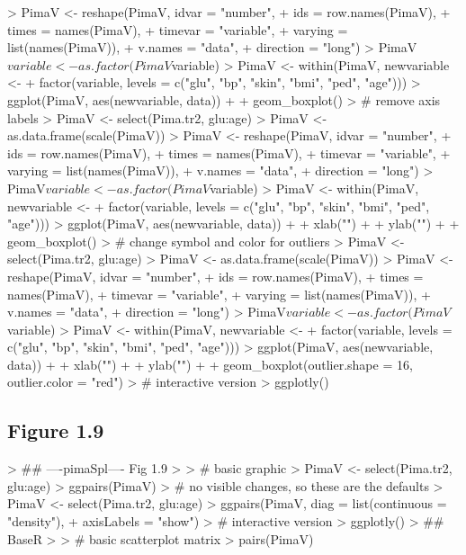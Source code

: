 \documentclass[12pt,letterpaper,final]{article}
\begin{document}
\begin{Schunk}
\begin{Sinput}
> PimaV <- reshape(PimaV, idvar = "number", 
+                  ids = row.names(PimaV),
+                  times = names(PimaV), 
+                  timevar = "variable", 
+                  varying = list(names(PimaV)), 
+                  v.names = "data",
+                  direction = "long")
> PimaV$variable <- as.factor(PimaV$variable)
> PimaV <- within(PimaV, newvariable <-
+                 factor(variable, levels = c("glu", "bp", "skin", "bmi", "ped", "age")))
> ggplot(PimaV, aes(newvariable, data)) +
+   geom_boxplot()
> # remove axis labels
> PimaV <- select(Pima.tr2, glu:age)
> PimaV <- as.data.frame(scale(PimaV))
> PimaV <- reshape(PimaV, idvar = "number", 
+                  ids = row.names(PimaV),
+                  times = names(PimaV), 
+                  timevar = "variable", 
+                  varying = list(names(PimaV)), 
+                  v.names = "data",
+                  direction = "long")
> PimaV$variable <- as.factor(PimaV$variable)
> PimaV <- within(PimaV, newvariable <-
+                 factor(variable, levels = c("glu", "bp", "skin", "bmi", "ped", "age")))
> ggplot(PimaV, aes(newvariable, data)) +
+   xlab("") +
+   ylab("") +
+   geom_boxplot()
> # change symbol and color for outliers
> PimaV <- select(Pima.tr2, glu:age)
> PimaV <- as.data.frame(scale(PimaV))
> PimaV <- reshape(PimaV, idvar = "number", 
+                  ids = row.names(PimaV),
+                  times = names(PimaV), 
+                  timevar = "variable", 
+                  varying = list(names(PimaV)), 
+                  v.names = "data",
+                  direction = "long")
> PimaV$variable <- as.factor(PimaV$variable)
> PimaV <- within(PimaV, newvariable <-
+                 factor(variable, levels = c("glu", "bp", "skin", "bmi", "ped", "age")))
> ggplot(PimaV, aes(newvariable, data)) +
+   xlab("") +
+   ylab("") +
+   geom_boxplot(outlier.shape = 16, outlier.color = "red")
> # interactive version
> ggplotly()
\end{Sinput}
\end{Schunk}


\subsection{Figure 1.9}


\begin{Schunk}
\begin{Sinput}
> ## ----pimaSpl---- Fig 1.9
> 
> # basic graphic
> PimaV <- select(Pima.tr2, glu:age)
> ggpairs(PimaV)
> # no visible changes, so these are the defaults
> PimaV <- select(Pima.tr2, glu:age)
> ggpairs(PimaV, diag = list(continuous = "density"),
+         axisLabels = "show")
> # interactive version
> ggplotly()
> ## BaseR
> 
> # basic scatterplot matrix
> pairs(PimaV)
\end{Sinput}
\end{Schunk}
\end{document}
